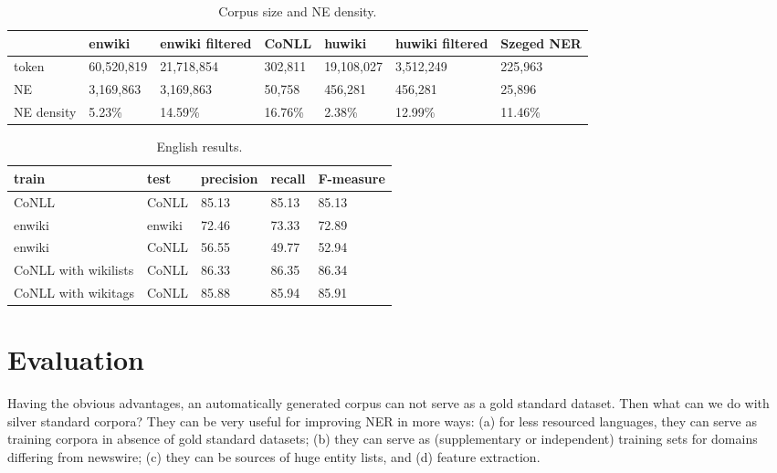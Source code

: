\documentclass[11pt]{article}
\begin{document}
\begin{table*}[ht]
\begin{center}
\begin{tabular}{lllllll}
\hline  & \bf enwiki & \bf enwiki filtered & \bf CoNLL & \bf huwiki & \bf huwiki filtered  & \bf Szeged NER \\ \hline
token & 60,520,819 & 21,718,854 & 302,811 &  19,108,027 & 3,512,249  & 225,963\\
NE & 3,169,863 & 3,169,863 & 50,758 & 456,281 & 456,281  & 25,896\\
NE density & 5.23\% & 14.59\% & 16.76\% & 2.38\% & 12.99\%  & 11.46\%\\
\hline
\end{tabular}
\end{center}
\caption{\label{size} Corpus size and NE density.}
\end{table*}

\begin{table*}[ht]
\begin{center}
\begin{tabular}{lllll}
\hline \bf train & \bf test & \bf precision & \bf recall & \bf F-measure \\ \hline
CoNLL & CoNLL & 85.13 & 85.13 & 85.13 \\
enwiki & enwiki & 72.46 & 73.33 &  72.89 \\
enwiki & CoNLL & 56.55 & 49.77 & 52.94 \\
CoNLL with wikilists & CoNLL & 86.33 & 86.35 & 86.34 \\
CoNLL with wikitags & CoNLL & 85.88 & 85.94 & 85.91 \\
\hline
\end{tabular}
\end{center}
\caption{\label{enresults} English results.}
\end{table*}

\section{Evaluation}
\label{sec:eval}

Having the obvious advantages, an automatically generated corpus can not serve as a gold standard dataset. Then what can we do with silver standard corpora? They can be very useful for improving NER in more ways: (a) for less resourced languages, they can serve as training corpora in absence of gold standard datasets; (b) they can serve as (supplementary or independent) training sets for domains differing from newswire; (c) they can be sources of huge entity lists, and (d) feature extraction. 
\end{document}
